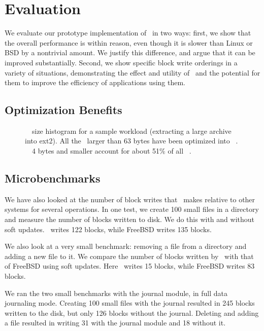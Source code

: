 \section {Evaluation}
\label{sec:evaluation}

We evaluate our prototype implementation of \Kudos\ in two ways: first, we
show that the overall performance is within reason, even though it is slower
than Linux or BSD by a nontrivial amount. We justify this difference, and argue
that it can be improved substantially. Second, we show specific block write
orderings in a variety of situations, demonstrating the effect and utility of
\opgroups\ and the potential for them to improve the efficiency of applications
using them.

\subsection {Optimization Benefits}

\begin{figure}[htb]
\vspace{-0.5\baselineskip}
\vspace{-0.5\baselineskip}
\caption{\label{fig:patchsize-histo} \Rb\ \chdesc\ size histogram for a sample
  workload (extracting a large archive into ext2). All the \chdescs\ larger than
  63 bytes have been optimized into \nrb\ \chdescs. \Rb\ \chdescs\ 4 bytes and
  smaller account for about 51\% of all \rb\ \chdescs.}
\end{figure}

\subsection {Microbenchmarks}
We have also looked at the number of block writes that \Kudos\ makes
relative to other systems for several operations. In one test, we
create 100 small files in a directory and measure the number of blocks
written to disk. We do this with and without soft updates. \Kudos\
writes 122 blocks, while FreeBSD writes 135 blocks.

We also look at a very small benchmark: removing a file from a
directory and adding a new file to it. We compare the number of blocks
written by \Kudos\ with that of FreeBSD using soft updates. Here
\Kudos\ writes 15 blocks, while FreeBSD writes 83 blocks.

We ran the two small benchmarks with the journal module, in full
data journaling mode. Creating 100 small files with the journal
resulted in 245 blocks written to the disk, but only 126 blocks
without the journal. Deleting and adding a file resulted in writing
31 with the journal module and 18 without it.

